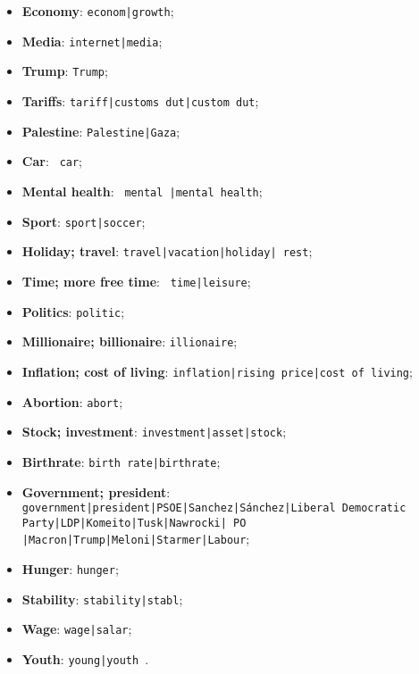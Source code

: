 \begin{itemize}
 \item \textbf{Economy}: \texttt{econom\allowbreak|growth};
 \item \textbf{Media}: \texttt{internet\allowbreak|media};
 \item \textbf{Trump}: \texttt{Trump};
 \item \textbf{Tariffs}: \texttt{tariff\allowbreak|customs dut\allowbreak|custom dut};
 \item \textbf{Palestine}: \texttt{Palestine\allowbreak|Gaza};
 \item \textbf{Car}: \texttt{ car};
 \item \textbf{Mental health}: \texttt{ mental \allowbreak|mental health};
 \item \textbf{Sport}: \texttt{sport\allowbreak|soccer};
 \item \textbf{Holiday; travel}: \texttt{travel\allowbreak|vacation\allowbreak|holiday\allowbreak| rest};
 \item \textbf{Time; more free time}: \texttt{ time\allowbreak|leisure};
 \item \textbf{Politics}: \texttt{politic};
 \item \textbf{Millionaire; billionaire}: \texttt{illionaire};
 \item \textbf{Inflation; cost of living}: \texttt{inflation\allowbreak|rising price\allowbreak|cost of living};
 \item \textbf{Abortion}: \texttt{abort};
 \item \textbf{Stock; investment}: \texttt{investment\allowbreak|asset\allowbreak|stock};
 \item \textbf{Birthrate}: \texttt{birth rate\allowbreak|birthrate};
 \item \textbf{Government; president}: \texttt{government\allowbreak|president\allowbreak|PSOE\allowbreak|Sanchez\allowbreak|Sánchez\allowbreak|Liberal Democratic Party\allowbreak|LDP\allowbreak|Komeito\allowbreak|Tusk\allowbreak|Nawrocki\allowbreak| PO \allowbreak|Macron\allowbreak|Trump\allowbreak|Meloni\allowbreak|Starmer\allowbreak|Labour};
 \item \textbf{Hunger}: \texttt{hunger};
 \item \textbf{Stability}: \texttt{stability\allowbreak|stabl};
 \item \textbf{Wage}: \texttt{wage\allowbreak|salar};
 \item \textbf{Youth}: \texttt{young\allowbreak|youth }. 
 \end{itemize}